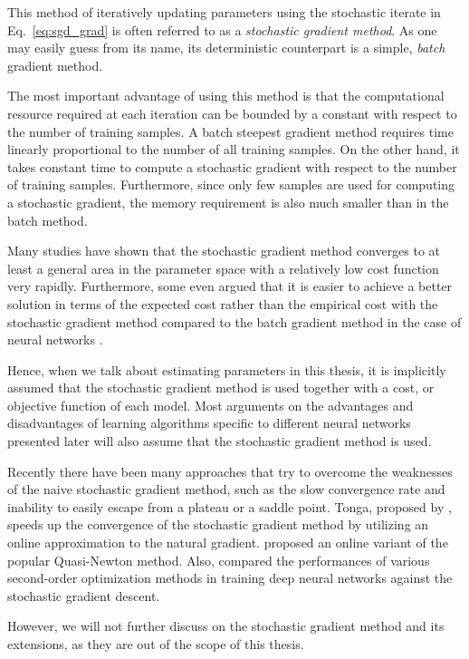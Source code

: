 \documentclass[dissertation,nocontribution,draft*]{aaltoseries}
\begin{document}
This method of iteratively updating parameters using the
stochastic iterate in Eq.~\eqref{eq:sgd_grad} is often
referred to as a \textit{stochastic gradient method}. As one
may easily guess from its name, its deterministic
counterpart is a simple, \textit{batch} gradient method.

The most important advantage of using this method is that
the computational resource required at each iteration can be
bounded by a constant with respect to the number of training
samples. A batch steepest gradient method requires time
linearly proportional to the number of all training samples.
On the other hand, it takes constant time to compute a stochastic
gradient with respect to the
number of training samples. Furthermore, since only few samples are used for
computing a stochastic gradient, the memory requirement is
also much smaller than in the batch method.

Many studies \citep[see, e.g.,][]{Bottou2008,Bottou2004}
have shown that the stochastic gradient method converges to
at least a general area in the parameter space with a
relatively low cost function very rapidly. Furthermore, some
even argued that it is easier to achieve a better solution
in terms of the expected cost rather than the empirical cost
with the stochastic gradient method compared to the batch
gradient method in the case of neural networks
\citep{Lecun1998a}.

Hence, when we talk about estimating
parameters in this thesis, it is implicitly assumed that the stochastic
gradient method is used together with a cost, or objective
function of each model. Most arguments on the advantages and
disadvantages of learning algorithms specific to different
neural networks presented later will also assume that the
stochastic gradient method is used.

Recently there have been many approaches that try to
overcome the weaknesses of the naive stochastic gradient
method, such as the slow convergence rate and inability to
easily escape from a plateau or a saddle point.  Tonga,
proposed by \citet{Roux2008a}, speeds up the convergence of
the stochastic gradient method by utilizing an online
approximation to the natural gradient.
\citet{Schraudolph2007} proposed an online variant of the
popular Quasi-Newton method.
Also, \citet{Le2011} compared the performances of various
second-order optimization methods in training deep neural
networks against the stochastic gradient descent.

However, we will not further discuss on the stochastic
gradient method and its extensions, as they are out of the
scope of this thesis.
\end{document}
